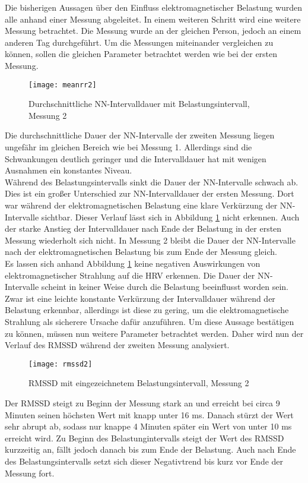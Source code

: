 Die bisherigen Aussagen über den Einfluss elektromagnetischer Belastung wurden alle anhand einer Messung abgeleitet. In einem weiteren Schritt wird eine weitere Messung betrachtet. Die Messung wurde an der gleichen Person, jedoch an einem anderen Tag durchgeführt. Um die Messungen miteinander vergleichen zu können, sollen die gleichen Parameter betrachtet werden wie bei der ersten Messung.
\begin{figure}[H]
	\centering
	\texttt{[image: meanrr2]}
	\caption{Durchschnittliche NN-Intervalldauer mit Belastungsintervall, Messung 2}
	\label{fig:meanrr2}
\end{figure}
Die durchschnittliche Dauer der NN-Intervalle der zweiten Messung liegen ungefähr im gleichen Bereich wie bei Messung 1. Allerdings sind die Schwankungen deutlich geringer und die Intervalldauer hat mit wenigen Ausnahmen ein konstantes Niveau. \\
Während des Belastungsintervalls sinkt die Dauer der NN-Intervalle schwach ab. Dies ist ein großer Unterschied zur NN-Intervalldauer der ersten Messung. Dort war während der elektromagnetischen Belastung eine klare Verkürzung der NN-Intervalle sichtbar. Dieser Verlauf lässt sich in Abbildung \ref{fig:meanrr2} nicht erkennen. Auch der starke Anstieg der Intervalldauer nach Ende der Belastung  in der ersten Messung wiederholt sich nicht. In Messung 2 bleibt die Dauer der NN-Intervalle nach der elektromagnetischen Belastung bis zum Ende der Messung gleich.\\
Es lassen sich anhand Abbildung \ref{fig:meanrr2} keine negativen Auswirkungen von elektromagnetischer Strahlung auf die HRV erkennen. Die Dauer der NN-Intervalle scheint in keiner Weise durch die Belastung beeinflusst worden sein. Zwar ist eine leichte konstante Verkürzung der Intervalldauer während der Belastung erkennbar, allerdings ist diese zu gering, um die elektromagnetische Strahlung als sicherere Ursache dafür anzuführen. Um diese Aussage bestätigen zu können, müssen nun weitere Parameter betrachtet werden. Daher wird nun der Verlauf des RMSSD während der zweiten Messung analysiert.
\begin{figure}[H]
	\centering
	\texttt{[image: rmssd2]}
	\caption{RMSSD mit eingezeichnetem Belastungsintervall, Messung 2}
	\label{fig:rmssd2}
\end{figure}
Der RMSSD steigt zu Beginn der Messung stark an und erreicht bei circa 9 Minuten seinen höchsten Wert mit knapp unter 16 ms. Danach stürzt der Wert sehr abrupt ab, sodass nur knappe 4 Minuten später ein Wert von unter 10 ms erreicht wird. Zu Beginn des Belastungintervalls steigt der Wert des RMSSD kurzzeitig an, fällt jedoch danach bis zum Ende der Belastung. Auch nach Ende des Belastungsintervalls setzt sich dieser Negativtrend bis kurz vor Ende der Messung fort.\\

